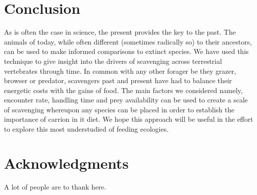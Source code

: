 \documentclass[a4paper,12pt]{article}
\begin{document}
\section*{Conclusion} 
As is often the case in science, the present provides the key to the past. The animals of today, while often different (sometimes radically so) to their ancestors, can be used to make informed comparisons to extinct species. 
We have used this technique to give insight into the drivers of scavenging across terrestrial vertebrates through time. In common with any other forager be they grazer, browser or predator, scavengers past and present have had to balance their energetic costs with the gains of food. 
The main factors we considered namely, encounter rate, handling time and prey availability can be used to create a scale of scavenging whereupon any species can be placed in order to establish the importance of carrion in it diet.  
We hope this approach will be useful in the effort to explore this most understudied of feeding ecologies. 


\section*{Acknowledgments}

A lot of people are to thank here.


\newpage



\end{document}
